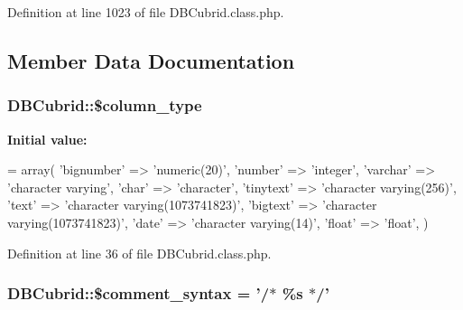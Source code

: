 Definition at line 1023 of file D\-B\-Cubrid.\-class.\-php.



\subsection{Member Data Documentation}
\hypertarget{classDBCubrid_a92995e5eed892ec4076cb3c1f5fdb2f1}{
\subsubsection[{\$column\-\_\-type}]{\setlength{\rightskip}{0pt plus 5cm}D\-B\-Cubrid\-::\$column\-\_\-type}}\label{classDBCubrid_a92995e5eed892ec4076cb3c1f5fdb2f1}
{\bfseries Initial value\-:}
\begin{DoxyCode}
= array(
        \textcolor{stringliteral}{'bignumber'} => \textcolor{stringliteral}{'numeric(20)'},
        \textcolor{stringliteral}{'number'} => \textcolor{stringliteral}{'integer'},
        \textcolor{stringliteral}{'varchar'} => \textcolor{stringliteral}{'character varying'},
        \textcolor{stringliteral}{'char'} => \textcolor{stringliteral}{'character'},
        \textcolor{stringliteral}{'tinytext'} => \textcolor{stringliteral}{'character varying(256)'},
        \textcolor{stringliteral}{'text'} => \textcolor{stringliteral}{'character varying(1073741823)'},
        \textcolor{stringliteral}{'bigtext'} => \textcolor{stringliteral}{'character varying(1073741823)'},
        \textcolor{stringliteral}{'date'} => \textcolor{stringliteral}{'character varying(14)'},
        \textcolor{stringliteral}{'float'} => \textcolor{stringliteral}{'float'},
    )
\end{DoxyCode}


Definition at line 36 of file D\-B\-Cubrid.\-class.\-php.

\hypertarget{classDBCubrid_a0060c7dcaf443efddbe4492d4479fe0b}{
\subsubsection[{\$comment\-\_\-syntax}]{\setlength{\rightskip}{0pt plus 5cm}D\-B\-Cubrid\-::\$comment\-\_\-syntax = '/$\ast$ \%s $\ast$/'}}\label{classDBCubrid_a0060c7dcaf443efddbe4492d4479fe0b}


